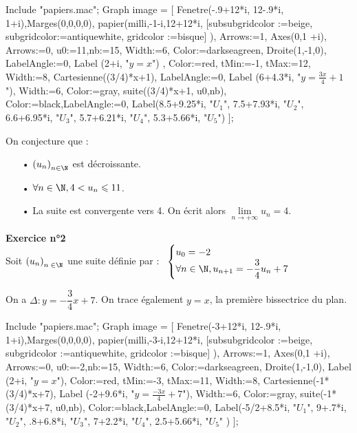 \begin{texgraph}[file,name=suite_02,export=tkz]
Include "papiers.mac";
Graph image = [
Fenetre(-.9+12*i, 12-.9*i, 1+i),Marges(0,0,0,0),
papier(milli,-1-i,12+12*i,
[subsubgridcolor :=beige,
subgridcolor:=antiquewhite,
gridcolor :=bisque]
),
  Arrows:=1,
Axes(0,1 +i),
  Arrows:=0,
  u0:=11,nb:=15, Width:=6,
Color:=darkseagreen, Droite(1,-1,0), 
LabelAngle:=0, Label (2+i, "$y=x$") ,
Color:=red,  tMin:=-1, tMax:=12, Width:=8, 
              Cartesienne((3/4)*x+1),
LabelAngle:=0, Label (6+4.3*i, "$y=\frac{3x}{4}+1$"),              
 Width:=6, Color:=gray,
  suite((3/4)*x+1, u0,nb),
Color:=black,LabelAngle:=0, 
Label(8.5+9.25*i, "$U_1$", 
      7.5+7.93*i, "$U_2$",  
      6.6+6.95*i, "$U_3$",   
      5.7+6.21*i, "$U_4$",   
      5.3+5.66*i, "$U_5$")   
];
\end{texgraph}

\vspace*{.5cm}

On conjecture que :

\begin{itemize}
\item[•] $\left(u_n\right)_{n \in \N}$ est décroissante.
\item[•] $\forall n \in \N, 4 < u_n \leqslant 11$.
\item[•] La suite est convergente vers 4. On écrit alors $\lim\limits_{n \to +\infty} u_n = 4$. 
\end{itemize}

\vspace*{.3cm}

\newpage

\textbf{Exercice n°2} \\

Soit $\left(u_n\right)_{n \; \in \N}$ une suite définie par :$ \; \; \; \begin{cases}
u_0 = -2 \\
\forall n \in \N, u_{n+1} = -\dfrac{3}{4}u_n + 7 \\
\end{cases}$ 

\vspace*{.3cm}

On a $\Delta : y = -\dfrac{3}{4}x + 7$. On trace également $y = x$, la première bissectrice du plan. \\

\begin{texgraph}[file,name=Suite03,export=pgf]
Include "papiers.mac";
Graph image = [
Fenetre(-3+12*i, 12-.9*i, 1+i),Marges(0,0,0,0),
papier(milli,-3-i,12+12*i,
          [subsubgridcolor :=beige,
              subgridcolor :=antiquewhite,
                 gridcolor :=bisque]
      ),
  Arrows:=1,
  Axes(0,1 +i),
  Arrows:=0,
  u0:=-2,nb:=15, Width:=6,
Color:=darkseagreen, Droite(1,-1,0), 
 Label (2+i, "$y=x$"),
Color:=red,  tMin:=-3, tMax:=11, Width:=8, 
              Cartesienne(-1*(3/4)*x+7),
 Label (-2+9.6*i, "$y=\frac{-3x}{4}+7$"),              
 Width:=6, Color:=gray,
             suite(-1*(3/4)*x+7, u0,nb),
Color:=black,LabelAngle:=0, 
Label(-5/2+8.5*i, "$U_1$", 
        9+.7*i,   "$U_2$",  
        .8+6.8*i, "$U_3$",   
         7+2.2*i,   "$U_4$",   
       2.5+5.66*i, "$U_5$"
)   
];
\end{texgraph}

